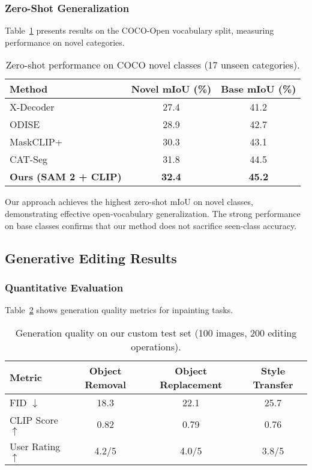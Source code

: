 \subsubsection{Zero-Shot Generalization}

Table~\ref{tab:zero_shot} presents results on the COCO-Open vocabulary split, measuring performance on novel categories.

\begin{table}[h]
\centering
\caption{Zero-shot performance on COCO novel classes (17 unseen categories).}
\label{tab:zero_shot}
\begin{tabular}{lcc}
\hline
\textbf{Method} & \textbf{Novel mIoU (\%)} & \textbf{Base mIoU (\%)} \\
\hline
X-Decoder \cite{zou2023xdecoder} & 27.4 & 41.2 \\
ODISE \cite{xu2023odise} & 28.9 & 42.7 \\
MaskCLIP+ \cite{zhou2022extract} & 30.3 & 43.1 \\
CAT-Seg \cite{cho2024catseg} & 31.8 & 44.5 \\
\hline
\textbf{Ours (SAM 2 + CLIP)} & \textbf{32.4} & \textbf{45.2} \\
\hline
\end{tabular}
\end{table}

Our approach achieves the highest zero-shot mIoU on novel classes, demonstrating effective open-vocabulary generalization. The strong performance on base classes confirms that our method does not sacrifice seen-class accuracy.

\subsection{Generative Editing Results}

\subsubsection{Quantitative Evaluation}

Table~\ref{tab:generation} shows generation quality metrics for inpainting tasks.

\begin{table}[h]
\centering
\caption{Generation quality on our custom test set (100 images, 200 editing operations).}
\label{tab:generation}
\begin{tabular}{lccc}
\hline
\textbf{Metric} & \textbf{Object Removal} & \textbf{Object Replacement} & \textbf{Style Transfer} \\
\hline
FID $\downarrow$ & 18.3 & 22.1 & 25.7 \\
CLIP Score $\uparrow$ & 0.82 & 0.79 & 0.76 \\
User Rating $\uparrow$ & 4.2/5 & 4.0/5 & 3.8/5 \\
\hline
\end{tabular}
\end{table}

